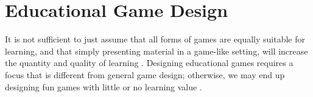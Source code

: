 \documentclass[a4paper,11.5pt]{report}
\numberwithin{figure}{section}
\numberwithin{table}{section}
\numberwithin{equation}{section}
\numberwithin{equation}{section}
\begin{document}


 








\section{Educational Game Design}


It is not sufficient to just assume that all forms of games are equally suitable for learning, and that simply presenting material in a game-like setting, will increase the quantity and quality of learning \citep{Breuer2010}. Designing educational games requires a focus that is different from general game design; otherwise, we may end up designing fun games with little or no learning value \citep{Barnes2007}.
\end{document}
